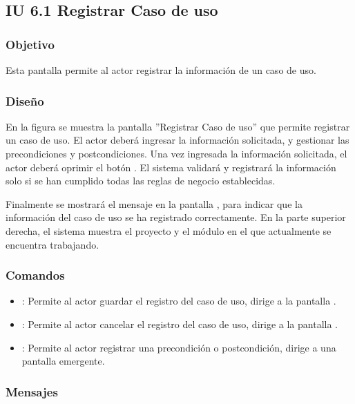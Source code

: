 \subsection{IU 6.1 Registrar Caso de uso}

\subsubsection{Objetivo}
	Esta pantalla permite al actor registrar la información de un caso de uso.
\subsubsection{Diseño}
	En la figura  se muestra la pantalla ''Registrar Caso de uso'' que permite registrar un caso de
	uso. El actor deberá ingresar la información solicitada, y gestionar las precondiciones y postcondiciones.
	Una vez ingresada la información solicitada, el actor deberá oprimir el botón  . El sistema validará y registrará la información solo si se han cumplido todas las reglas de negocio establecidas.
	
	Finalmente se mostrará el mensaje  en la pantalla , para indicar que la información del caso de uso se ha registrado correctamente.
	En la parte superior derecha, el sistema muestra el proyecto y el módulo en el que actualmente se encuentra trabajando.

\subsubsection{Comandos}
\begin{itemize}
	\item {}: Permite al actor guardar el registro del caso de uso, dirige a la pantalla .
	\item {}: Permite al actor cancelar el registro del caso de uso, dirige a la pantalla .
	\item {}: Permite al actor registrar una precondición o postcondición, dirige a una pantalla emergente.
\end{itemize}

\subsubsection{Mensajes}

